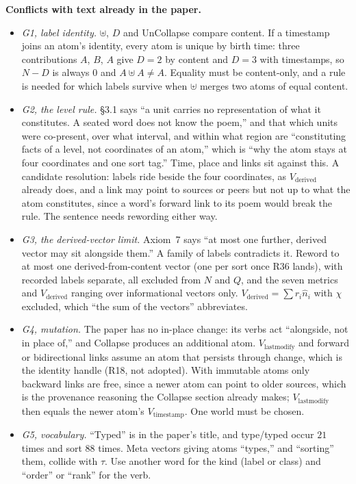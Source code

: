 \documentclass[11pt]{article}
\begin{document}
\textbf{Conflicts with text already in the paper.}
\begin{itemize}
\item \emph{G1, label identity.} $\uplus$, $D$ and UnCollapse compare
content. If a timestamp joins an atom's identity, every atom is unique by
birth time: three contributions $A$, $B$, $A$ give $D=2$ by content and
$D=3$ with timestamps, so $N-D$ is always $0$ and $A\uplus A\ne A$.
Equality must be content-only, and a rule is needed for which labels
survive when $\uplus$ merges two atoms of equal content.
\item \emph{G2, the level rule.} \S3.1 says ``a unit carries no
representation of what it constitutes. A seated word does not know the
poem,'' and that which units were co-present, over what interval, and
within what region are ``constituting facts of a level, not coordinates
of an atom,'' which is ``why the atom stays at four coordinates and one
sort tag.'' Time, place and links sit against this. A candidate
resolution: labels ride beside the four coordinates, as $V_{\text{derived}}$
already does, and a link may point to sources or peers but not up to what
the atom constitutes, since a word's forward link to its poem would break
the rule. The sentence needs rewording either way.
\item \emph{G3, the derived-vector limit.} Axiom~7 says ``at most one
further, derived vector may sit alongside them.'' A family of labels
contradicts it. Reword to at most one derived-from-content vector (one per
sort once R36 lands), with recorded labels separate, all excluded from $N$
and $Q$, and the seven metrics and $V_{\text{derived}}$ ranging over
informational vectors only. $V_{\text{derived}}=\sum r_i\hat n_i$ with
$\chi$ excluded, which ``the sum of the vectors'' abbreviates.
\item \emph{G4, mutation.} The paper has no in-place change: its verbs
act ``alongside, not in place of,'' and Collapse produces an additional
atom. $V_{\text{lastmodify}}$ and forward or bidirectional links assume an
atom that persists through change, which is the identity handle (R18,
not adopted). With immutable atoms only backward links are free, since a
newer atom can point to older sources, which is the provenance reasoning
the Collapse section already makes; $V_{\text{lastmodify}}$ then equals
the newer atom's $V_{\text{timestamp}}$. One world must be chosen.
\item \emph{G5, vocabulary.} ``Typed'' is in the paper's title, and
type/typed occur $21$ times and sort $88$ times. Meta vectors giving
atoms ``types,'' and ``sorting'' them, collide with $\tau$. Use another
word for the kind (label or class) and ``order'' or ``rank'' for the verb.
\end{itemize}
\end{document}
